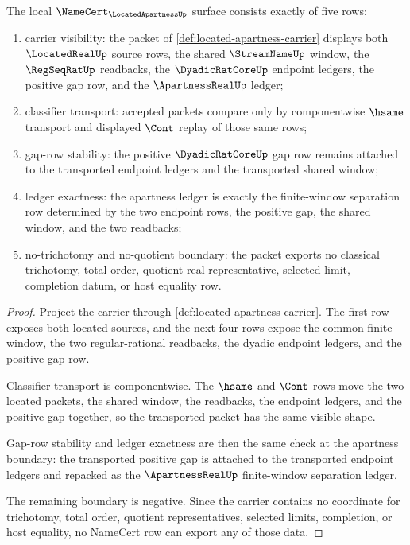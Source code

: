 \begin{theorem}
\label{thm:located-apartness-namecert-obligation-surface}
The local $\NameCert_{\LocatedApartnessUp}$ surface consists exactly of five
rows:
\begin{enumerate}
\item carrier visibility: the packet of
\autoref{def:located-apartness-carrier} displays both $\LocatedRealUp$ source
rows, the shared $\StreamNameUp$ window, the $\RegSeqRatUp$ readbacks, the
$\DyadicRatCoreUp$ endpoint ledgers, the positive gap row, and the
$\ApartnessRealUp$ ledger;
\item classifier transport: accepted packets compare only by componentwise
$\hsame$ transport and displayed $\Cont$ replay of those same rows;
\item gap-row stability: the positive $\DyadicRatCoreUp$ gap row remains
attached to the transported endpoint ledgers and the transported shared
window;
\item ledger exactness: the apartness ledger is exactly the finite-window
separation row determined by the two endpoint rows, the positive gap, the
shared window, and the two readbacks;
\item no-trichotomy and no-quotient boundary: the packet exports no classical
trichotomy, total order, quotient real representative, selected limit,
completion datum, or host equality row.
\end{enumerate}
\end{theorem}
\begin{proof}
Project the carrier through \autoref{def:located-apartness-carrier}. The first
row exposes both located sources, and the next four rows expose the common
finite window, the two regular-rational readbacks, the dyadic endpoint
ledgers, and the positive gap row.

Classifier transport is componentwise. The $\hsame$ and $\Cont$ rows move the
two located packets, the shared window, the readbacks, the endpoint ledgers,
and the positive gap together, so the transported packet has the same visible
shape.

Gap-row stability and ledger exactness are then the same check at the
apartness boundary: the transported positive gap is attached to the transported
endpoint ledgers and repacked as the $\ApartnessRealUp$ finite-window
separation ledger.

The remaining boundary is negative. Since the carrier contains no coordinate
for trichotomy, total order, quotient representatives, selected limits,
completion, or host equality, no NameCert row can export any of those data.
\end{proof}

